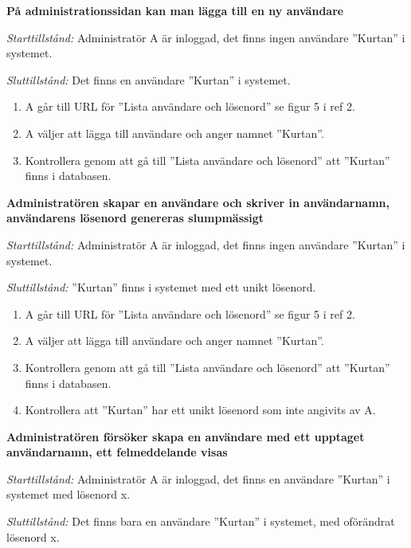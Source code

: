 \documentclass[a4paper]{article}
\begin{document}
\begin{FT}
\item %
\textbf{På administrationssidan kan man lägga till en ny användare}

\emph{Starttillstånd:} Administratör A är inloggad, det finns ingen användare ''Kurtan'' i systemet.

\emph{Sluttillstånd:} Det finns en användare ''Kurtan'' i systemet.

\begin{enumerate}
\item A går till URL för ''Lista användare och lösenord'' se figur 5 i ref 2.
\item  A väljer att lägga till användare och anger namnet ''Kurtan''.
\item Kontrollera genom att gå till ''Lista användare och lösenord'' att ''Kurtan'' finns i databasen.
\end{enumerate}

\item %
\textbf{Administratören skapar en användare och skriver in användarnamn, användarens lösenord genereras slumpmässigt}

\emph{Starttillstånd:} Administratör A är inloggad, det finns ingen användare ''Kurtan'' i systemet.

\emph{Sluttillstånd:} ''Kurtan'' finns i systemet med ett unikt lösenord.

\begin{enumerate}
\item A går till URL för ''Lista användare och lösenord'' se figur 5 i ref 2.
\item  A väljer att lägga till användare och anger namnet ''Kurtan''.
\item Kontrollera genom att gå till ''Lista användare och lösenord'' att ''Kurtan'' finns i databasen.
\item Kontrollera att ''Kurtan'' har ett unikt lösenord som inte angivits av A.
\end{enumerate}

\item %
\textbf{Administratören försöker skapa en användare med ett upptaget användarnamn, ett felmeddelande visas}

\emph{Starttillstånd:} Administratör A är inloggad, det finns en användare ''Kurtan'' i systemet med lösenord x.

\emph{Sluttillstånd:} Det finns bara en användare ''Kurtan'' i systemet, med oförändrat lösenord x.


\end{FT}
\end{document}
